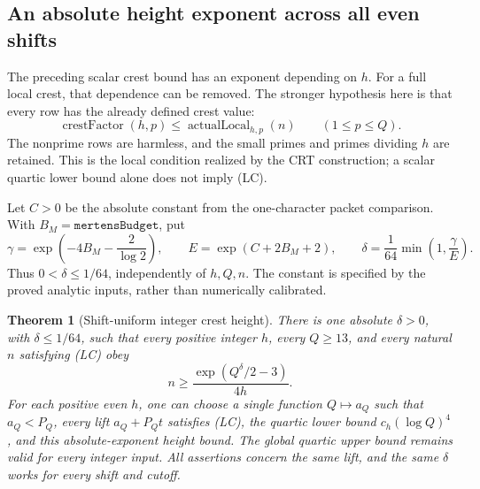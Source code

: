 \documentclass[11pt]{article}
\newtheorem{theorem}{Theorem}[section]
\begin{document}
\subsection{An absolute height exponent across all even shifts}
The preceding scalar crest bound has an exponent depending on \(h\).
For a full local crest, that dependence can be removed. The stronger
hypothesis here is that every row has the already defined crest value:
\[
 \operatorname{crestFactor}(h,p)
       \leq \operatorname{actualLocal}_{h,p}(n)
       \qquad(1\leq p\leq Q).
 \tag{LC}
\]
The nonprime rows are harmless, and the small primes and primes dividing
\(h\) are retained. This is the local condition realized by the CRT
construction; a scalar quartic lower bound alone does not imply (LC).

Let \(C>0\) be the absolute constant from the one-character packet
comparison. With \(B_M=\texttt{mertensBudget}\), put
\[
 \gamma=\exp\!\left(-4B_M-\frac{2}{\log2}\right),\qquad
 E=\exp(C+2B_M+2),\qquad
 \delta=\frac{1}{64}\min\left(1,\frac{\gamma}{E}\right).
\]
Thus \(0<\delta\leq1/64\), independently of \(h,Q,n\).
The constant is specified by the proved analytic inputs, rather than
numerically calibrated.

\begin{theorem}[Shift-uniform integer crest height]
\label{thm:shift-uniform-integer-crest-height}
There is one absolute \(\delta>0\), with \(\delta\leq1/64\), such
that every positive integer \(h\), every \(Q\geq13\), and every
natural \(n\) satisfying (LC) obey
\[
                n\geq\frac{\exp(Q^\delta/2-3)}{4h}.
\]
For each positive even \(h\), one can choose a single function
\(Q\mapsto a_Q\) such that \(a_Q<P_Q\), every lift
\(a_Q+P_Qt\) satisfies (LC), the quartic lower bound
\(c_h(\log Q)^4\), and this absolute-exponent height bound.
The global quartic upper bound remains valid for every integer input.
All assertions concern the same lift, and the same \(\delta\) works
for every shift and cutoff.
\end{theorem}
\end{document}
